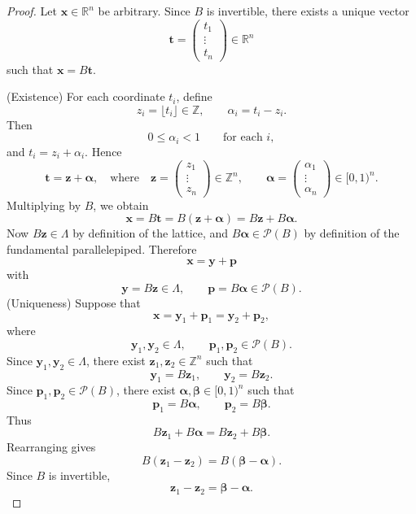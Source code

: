 \begin{proof}
	Let \(\mathbf x\in\mathbb R^n\) be arbitrary. Since \(B\) is invertible, there exists a unique vector
	\[
	\mathbf t=
	\begin{pmatrix}
		t_1\\
		\vdots\\
		t_n
	\end{pmatrix}
	\in\mathbb R^n
	\]
	such that $
	\mathbf x=B\mathbf t$. 
	
	\medskip
	\noindent
	(Existence) For each coordinate \(t_i\), define
	\[
	z_i=\lfloor t_i\rfloor\in\mathbb Z,
	\qquad
	\alpha_i=t_i-z_i.
	\]
	Then
	\[
	0\le \alpha_i<1
	\qquad\text{for each }i,
	\]
	and $
	t_i=z_i+\alpha_i.$ Hence
	\[
	\mathbf t=\mathbf z+\boldsymbol\alpha,\quad\text{where}\quad
	\mathbf z=
	\begin{pmatrix}
		z_1\\
		\vdots\\
		z_n
	\end{pmatrix}\in\mathbb Z^n,
	\qquad
	\boldsymbol\alpha=
	\begin{pmatrix}
		\alpha_1\\
		\vdots\\
		\alpha_n
	\end{pmatrix}\in[0,1)^n.
	\]
	Multiplying by \(B\), we obtain
	\[
	\mathbf x=B\mathbf t=B(\mathbf z+\boldsymbol\alpha)=B\mathbf z+B\boldsymbol\alpha.
	\]
	Now \(B\mathbf z\in\Lambda\) by definition of the lattice, and \(B\boldsymbol\alpha\in\mathcal P(B)\) by definition of the fundamental parallelepiped. Therefore
	\[
	\mathbf x=\mathbf y+\mathbf p
	\]
	with
	\[
	\mathbf y=B\mathbf z\in\Lambda,
	\qquad
	\mathbf p=B\boldsymbol\alpha\in\mathcal P(B).
	\]
	\newpage\noindent
	(Uniqueness)\; Suppose that
	\[
	\mathbf x=\mathbf y_1+\mathbf p_1=\mathbf y_2+\mathbf p_2,
	\]
	where
	\[
	\mathbf y_1,\mathbf y_2\in\Lambda,
	\qquad
	\mathbf p_1,\mathbf p_2\in\mathcal P(B).
	\]
	Since \(\mathbf y_1,\mathbf y_2\in\Lambda\), there exist \(\mathbf z_1,\mathbf z_2\in\mathbb Z^n\) such that
	\[
	\mathbf y_1=B\mathbf z_1,
	\qquad
	\mathbf y_2=B\mathbf z_2.
	\]
	Since \(\mathbf p_1,\mathbf p_2\in\mathcal P(B)\), there exist \(\boldsymbol\alpha,\boldsymbol\beta\in[0,1)^n\) such that
	\[
	\mathbf p_1=B\boldsymbol\alpha,
	\qquad
	\mathbf p_2=B\boldsymbol\beta.
	\]
	Thus
	\[
	B\mathbf z_1+B\boldsymbol\alpha
	=
	B\mathbf z_2+B\boldsymbol\beta.
	\]
	Rearranging gives
	\[
	B(\mathbf z_1-\mathbf z_2)=B(\boldsymbol\beta-\boldsymbol\alpha).
	\]
	Since \(B\) is invertible,
	\[
	\mathbf z_1-\mathbf z_2=\boldsymbol\beta-\boldsymbol\alpha.
\]
\end{proof}
